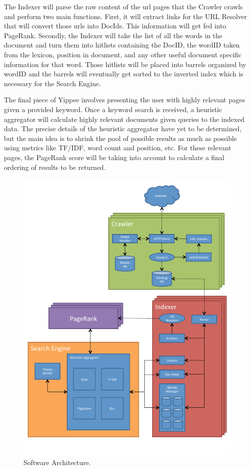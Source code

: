 \documentclass[11pt, letterpaper, oneside, twocolumn]{article}
\begin{document}
The Indexer will parse the raw content of the url pages that the Crawler crawls and perform two
main functions. First, it will extract links for the URL Resolver that will
convert those urls into DocIds. This information will get fed into PageRank.
Secondly, the Indexer will take the list of all the words in the document and
turn them into hitlists containing the DocID, the wordID taken from the lexicon, position in document, and any other useful document specific information for that word. Those hitlists will be placed into barrels organized by wordID and the barrels will eventually get sorted to the inverted index which is necessary for the Search Engine.

The final piece of Yippee involves presenting the user with highly relevant pages given a provided keyword. Once a keyword search is received, a heuristic aggregator will calculate highly relevant documents given queries to the indexed data. The precise details of the heuristic aggregator have yet to be determined, but the main idea is to shrink the pool of possible results as much as possible using metrics like TF/IDF, word count and position, etc.  For these relevant pages, the PageRank score will be taking into account to calculate a final ordering of results to be returned.


\label{sec:SOAR} %
\begin{figure}[!b]
  \centering
  \includegraphics[scale=0.50]{figures/yippee_map.pdf}
  \caption{Software Architecture.}
\end{figure}
\end{document}
